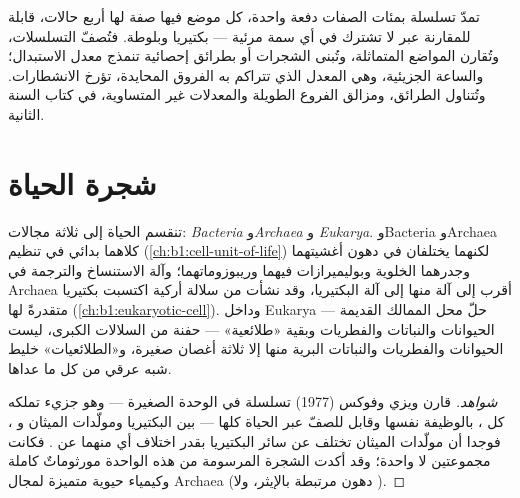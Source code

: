 \begin{remark}\label{rem:b1:classifying-biodiversity:molecular}
تمدّ تسلسلة  بمئات الصفات دفعة واحدة، كل موضع فيها
صفة لها أربع حالات، قابلة للمقارنة عبر  لا تشترك
في أي سمة مرئية --- بكتيريا وبلوطة. فتُصفّ التسلسلات، وتُقارن
المواضع المتماثلة، وتُبنى الشجرات  أو بطرائق
إحصائية تنمذج معدل الاستبدال؛ والساعة
الجزيئية، وهي المعدل الذي تتراكم به الفروق المحايدة،
تؤرخ الانشطارات. وتُتناول الطرائق، ومزالق الفروع الطويلة
والمعدلات غير المتساوية، في كتاب السنة الثانية.
\end{remark}

\section{شجرة الحياة}

\begin{proposition}\label{prop:b1:classifying-biodiversity:domains}
تنقسم الحياة إلى ثلاثة مجالات: \emph{Bacteria} و\emph{Archaea} و
\emph{Eukarya}. وBacteria وArchaea كلاهما بدائي  في تنظيم
 (\cref{ch:b1:cell-unit-of-life}) لكنهما يختلفان في
دهون أغشيتهما وجدرهما الخلوية وبوليميرازات  فيهما وريبوزوماتهما؛
وآلة الاستنساخ والترجمة في Archaea أقرب إلى آلة 
منها إلى آلة البكتيريا، وقد نشأت 
من سلالة أركية اكتسبت بكتيريا متقدرةً لها
(\cref{ch:b1:eukaryotic-cell}). وداخل Eukarya حلّ محل
الممالك القديمة --- الحيوانات والنباتات والفطريات وبقية «طلائعية» ---
حفنة من السلالات الكبرى، ليست الحيوانات
والفطريات والنباتات البرية منها إلا ثلاثة أغصان صغيرة،
و«الطلائعيات» خليط شبه عرقي من كل ما عداها.
\end{proposition}
\begin{proof}[شواهد]
قارن ويزي وفوكس (1977) تسلسلة  في الوحدة
الصغيرة --- وهو جزيء تملكه كل ، بالوظيفة نفسها وقابل
للصفّ عبر الحياة كلها --- بين البكتيريا ومولّدات الميثان و
، فوجدا أن مولّدات الميثان تختلف عن سائر
البكتيريا بقدر اختلاف أي منهما عن . فكانت
 مجموعتين لا واحدة؛ وقد أكدت الشجرة المرسومة من هذه
 الواحدة مورثوماتٌ كاملة وكيمياء حيوية متميزة
لمجال Archaea (دهون مرتبطة بالإيثر، ولا ).
\end{proof}

